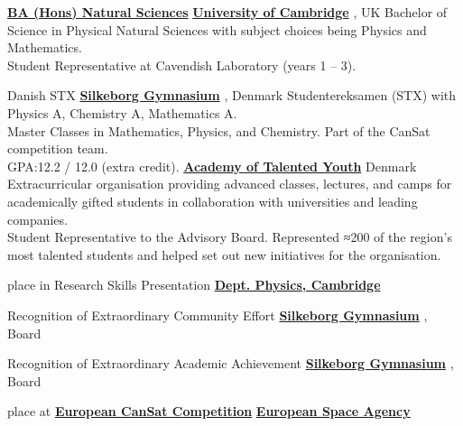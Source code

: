 \documentclass[
	a4paper,
	10pt,
	profilepicstyle=profilecircle,
]{fortysecondscv}
\newcommand{\cvsectionvspace}{\vspace{-0.5em}}
\newcommand{\cvsubsectionvspace}{\vspace{-1.0em}}
\newcommand{\linknoicon}[2]{%
	{\href{#1}{\textcolor{maincolor!70}{\textbf{#2}}}}%
}
\begin{document}
\cvsectionvspace
{}
\cvsubsectionvspace
\begin{cvtable}[1.6]
	{\linknoicon{https://www.undergraduate.study.cam.ac.uk/courses/natural-sciences}{BA (Hons) Natural Sciences}}
	{\linknoicon{https://www.cam.ac.uk/}{University of Cambridge}, UK}
	{
		Bachelor of Science in Physical Natural Sciences with subject choices being Physics and Mathematics.\\
		Student Representative at Cavendish Laboratory (years 1 -- 3).
	}
\end{cvtable}

\cvsubsectionvspace
\begin{cvtable}[1.6]
	{Danish STX}
	{\linknoicon{https://www.gymnasiet.dk/}{Silkeborg Gymnasium}, Denmark}
	{
		Studentereksamen (STX) with Physics A, Chemistry A, Mathematics A.\\
		Master Classes in Mathematics, Physics, and Chemistry. Part of the CanSat competition team.\\
		GPA:\@ 12.2 / 12.0 (extra credit).
	}
	{\linknoicon{https://talentfuldeunge.dk/}{Academy of Talented Youth}}
	{Denmark}
	{
		Extracurricular organisation providing advanced classes, lectures,
		and camps for academically gifted students in collaboration with universities
		and leading companies.\\
		Student Representative to the Advisory Board.
		Represented ≈200 of the region's most talented students and helped set out new initiatives
		for the organisation.
	}
\end{cvtable}

\newpage
\makebacksidebar

\cvsectionvspace
\begin{cvtable}[1.6]
	{ place in Research Skills Presentation}
	{\linknoicon{https://www.phy.cam.ac.uk/}{Dept. Physics, Cambridge}}
	{}

	{Recognition of Extraordinary Community Effort}
	{\linknoicon{https://www.gymnasiet.dk/}{Silkeborg Gymnasium}, Board}
	{}

	{Recognition of Extraordinary Academic Achievement}
	{\linknoicon{https://www.gymnasiet.dk/}{Silkeborg Gymnasium}, Board}
	{}

	{ place at \linknoicon{https://www.esa.int/Education/CanSat}{European CanSat Competition}}
	{\linknoicon{https://www.esa.int/}{European Space Agency}}
	{}
\end{cvtable}
\end{document}
